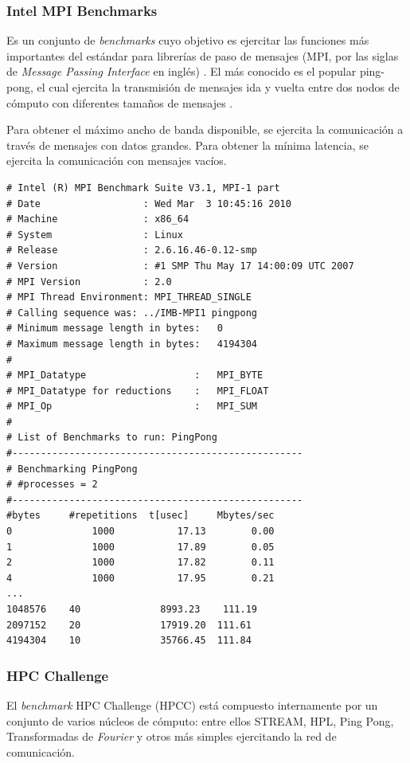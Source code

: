 \documentclass[a4paper]{report}
\begin{document}
\subsubsection{Intel MPI Benchmarks}

Es un conjunto de {\it benchmarks} cuyo objetivo es ejercitar las funciones más importantes del estándar para librerías de paso de mensajes
(MPI, por las siglas de {\it Message Passing Interface} en inglés) \cite{mpi-standard}.
El más conocido es el popular ping-pong, el cual ejercita la transmisión de mensajes ida y vuelta entre dos nodos de cómputo con diferentes tamaños de mensajes \cite{latency}.

\bigskip

Para obtener el máximo ancho de banda disponible, se ejercita la comunicación a través de mensajes con datos grandes. 
Para obtener la mínima latencia, se ejercita la comunicación con mensajes vacíos.

{\small
\begin{verbatim}
# Intel (R) MPI Benchmark Suite V3.1, MPI-1 part
# Date                  : Wed Mar  3 10:45:16 2010
# Machine               : x86_64
# System                : Linux
# Release               : 2.6.16.46-0.12-smp
# Version               : #1 SMP Thu May 17 14:00:09 UTC 2007
# MPI Version           : 2.0
# MPI Thread Environment: MPI_THREAD_SINGLE
# Calling sequence was: ../IMB-MPI1 pingpong
# Minimum message length in bytes:   0
# Maximum message length in bytes:   4194304
#
# MPI_Datatype                   :   MPI_BYTE
# MPI_Datatype for reductions    :   MPI_FLOAT
# MPI_Op                         :   MPI_SUM
#
# List of Benchmarks to run: PingPong
#---------------------------------------------------
# Benchmarking PingPong
# #processes = 2
#---------------------------------------------------
#bytes     #repetitions  t[usec]     Mbytes/sec
0              1000           17.13        0.00
1              1000           17.89        0.05
2              1000           17.82        0.11
4              1000           17.95        0.21
...
1048576    40              8993.23    111.19
2097152    20              17919.20  111.61
4194304    10              35766.45  111.84
\end{verbatim}
}

\subsubsection{HPC Challenge}

El {\it benchmark} HPC Challenge \cite{hpcc} (HPCC) está compuesto internamente por un conjunto de varios núcleos de cómputo: entre ellos STREAM, HPL, Ping Pong,
Transformadas de {\it Fourier} y otros más simples ejercitando la red de comunicación.
\end{document}

